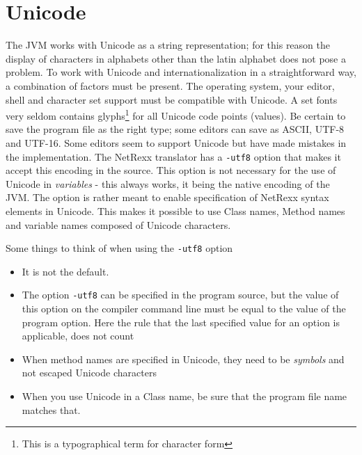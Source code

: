 \chapter{Unicode}
The JVM works with Unicode as a string representation; for this reason the display of characters in alphabets other than the latin alphabet does not pose a problem. To work with Unicode and internationalization in a straightforward way, a combination of factors must be present. The operating system, your editor, shell and character set support must be compatible with Unicode. A set fonts very seldom contains glyphs\footnote{This is a typographical term for character form} for all Unicode code points (values). Be certain to save the program file as the right type; some editors can save as ASCII, UTF-8 and UTF-16. Some editors seem to support Unicode but have made mistakes in the implementation. The NetRexx translator has a \texttt{-utf8} option that makes it accept this encoding in the source. This option is not necessary for the use of Unicode in \emph{variables} - this always works, it being the native encoding of the JVM. The option is rather meant to enable specification of NetRexx syntax elements in Unicode. This makes it possible to use Class names, Method names and variable names composed of Unicode characters.

Some things to think of when using the \texttt{-utf8} option
\begin{itemize}
\item It is not the default.
\item The option \texttt{-utf8} can be specified in the program source, but the value of this option on the compiler command line must be equal to the value of the program option. Here the rule that the last specified value for an option is applicable, does not count
\item When method names are specified in Unicode, they need to be \emph{symbols} and not escaped Unicode characters
\item When you use Unicode in a Class name, be sure that the program file name matches that.
\end{itemize}

